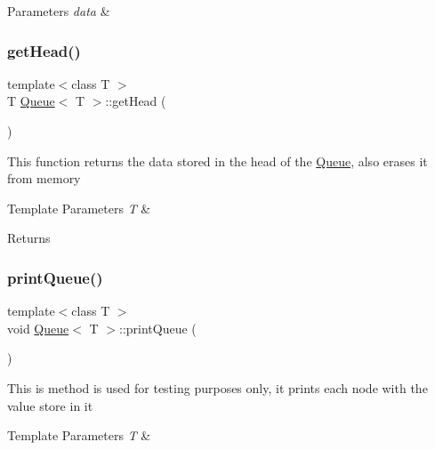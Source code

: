\begin{DoxyParams}{Parameters}
{\em data} & \\
\hline
\end{DoxyParams}
\mbox{\label{class_queue_ab5e1528ddf791c4b1e72082b2fedb540}} 
\subsubsection{\texorpdfstring{getHead()}{getHead()}}
{\footnotesize\ttfamily template$<$class T $>$ \\
T \mbox{\hyperlink{class_queue}{Queue}}$<$ T $>$\+::get\+Head (\begin{DoxyParamCaption}{ }\end{DoxyParamCaption})}

This function returns the data stored in the head of the \mbox{\hyperlink{class_queue}{Queue}}, also erases it from memory 
\begin{DoxyTemplParams}{Template Parameters}
{\em T} & \\
\hline
\end{DoxyTemplParams}
\begin{DoxyReturn}{Returns}

\end{DoxyReturn}
\mbox{\label{class_queue_adb7623e0e38d05b7de1bf6f812a26c3f}} 
\subsubsection{\texorpdfstring{printQueue()}{printQueue()}}
{\footnotesize\ttfamily template$<$class T $>$ \\
void \mbox{\hyperlink{class_queue}{Queue}}$<$ T $>$\+::print\+Queue (\begin{DoxyParamCaption}{ }\end{DoxyParamCaption})}

This is method is used for testing purposes only, it prints each node with the value store in it 
\begin{DoxyTemplParams}{Template Parameters}
{\em T} & \\
\hline
\end{DoxyTemplParams}
\mbox{\label{class_queue_a30ecd50a120ac43c94a85629d172f560}} 
